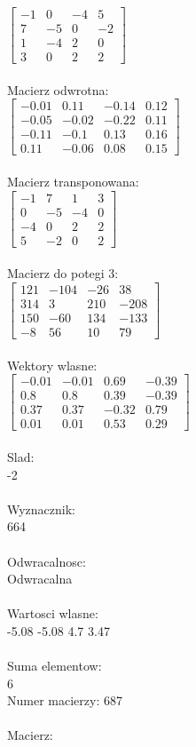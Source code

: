 \documentclass[a4paper,12pt]{article}
\begin{document}
$\begin{bmatrix} -1&0&-4&5\\7&-5&0&-2\\1&-4&2&0\\3&0&2&2 \end{bmatrix}$
\\
\\
Macierz odwrotna:\\

$\begin{bmatrix} -0.01&0.11&-0.14&0.12\\-0.05&-0.02&-0.22&0.11\\-0.11&-0.1&0.13&0.16\\0.11&-0.06&0.08&0.15 \end{bmatrix}$
\\
\\
Macierz transponowana:\\

$\begin{bmatrix} -1&7&1&3\\0&-5&-4&0\\-4&0&2&2\\5&-2&0&2 \end{bmatrix}$
\\
\\
Macierz do potegi 3:\\

$\begin{bmatrix} 121&-104&-26&38\\314&3&210&-208\\150&-60&134&-133\\-8&56&10&79 \end{bmatrix}$
\\
\\
Wektory wlasne:\\

$\begin{bmatrix} -0.01&-0.01&0.69&-0.39\\0.8&0.8&0.39&-0.39\\0.37&0.37&-0.32&0.79\\0.01&0.01&0.53&0.29 \end{bmatrix}$
\\
\\
Slad:\\
-2
\\
\\
Wyznacznik:\\
664
\\
\\
Odwracalnosc:\\
Odwracalna
\\
\\
Wartosci wlasne:\\
-5.08 -5.08 4.7 3.47
\\
\\
Suma elementow:\\
6
\\
\newpage
Numer macierzy:
687
\\
\\
Macierz:\\
\end{document}
